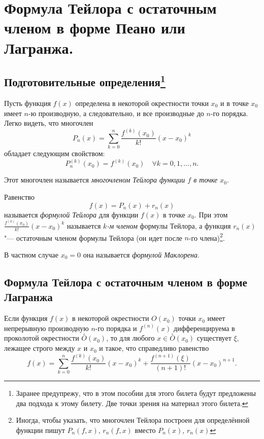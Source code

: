 \chapter{Формула Тейлора с остаточным членом в форме Пеано или Лагранжа.}

\section[Подготовительные определения]{Подготовительные определения\footnote{Заранее предупрежу, что в этом пособии для этого билета будут предложены два подхода к этому билету. Две точки зрения на материал этого билета.}}\label{ch5:sectearldefs}

Пусть функция $f(x)$ определена в некоторой окрестности точки $x_0$ и в точке $x_0$ имеет $n$-ю производную, а следовательно, и все производные до $n$-го порядка. Легко видеть, что многочлен
$$
P_n(x) = \sum_{k = 0}^{n} \frac{f^{(k)}(x_0)}{k!} (x - x_0)^k
$$
обладает следующим свойством:
$$
P_n^{(k)}(x_0) = f^{(k)}(x_0) \quad \forall k = 0,1,\ldots,n.
$$

\noindent Этот многочлен называется \textit{многочленом Тейлора функции $f$ в точке $x_0$}.

Равенство $$f(x) = P_n(x) + r_n(x)$$ называется \textit{формулой Тейлора} для функции $f(x)$ в точке $x_0$. При этом $\frac{f^{(k)}(x_0)}{k!} (x - x_0)^k$ называется \textit{$k$-м членом} формулы Тейлора, а функция $r_n(x)$ "--- остаточным членом формулы Тейлора (он идет после $n$-го члена)\footnote{Иногда, чтобы указать, что многочлен Тейлора построен для определённой функции пишут $P_n(f,x)$, $r_n(f,x)$ вместо $P_n(x)$, $r_n(x)$}. 

\begin{notion} В частном случае $x_0=0$ она называется \textit{формулой Маклорена}.
\end{notion}

\section[Формула Тейлора с остаточным членом в форме Лагранжа]{Формула Тейлора с остаточным членом в форме Лагранжа}
	
\begin{thm} \label{ch5.thm1}
Если функция $f(x)$ в некоторой окрестности $O(x_0)$ точки $x_0$ имеет непрерывную производную $n$-го порядка и $f^{(n)}(x)$ дифференцируема в проколотой окрестности $\overset{\circ}{O}(x_0)$, то для любого
$x \in \overset{\circ}{O}(x_0)$ существует $\xi$, лежащее строго между $x$ и $x_0$ и такое, что справедливо равенство
\begin{equation} \label{ch5.1eq1}
f(x) = \sum_{k = 0}^{n} \frac{f^{(k)}(x_0)}{k!}(x - x_0)^k + \frac{f^{(n + 1)}(\xi)}{(n + 1)!}(x - x_0)^{n + 1}.
\end{equation}
\end{thm}

